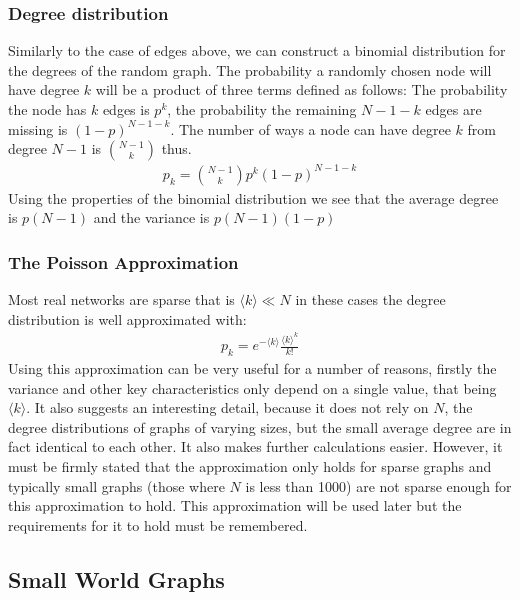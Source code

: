 \documentclass{article}
\begin{document}
            \subsubsection{Degree distribution}
            Similarly to the case of edges above, we can construct a binomial distribution for the degrees of the random graph. The probability a randomly chosen node will have degree $k$ will be a product of three terms defined as follows: The probability the node has $k$ edges is $p^k$, the probability the remaining $N-1-k$ edges are missing is $(1-p)^{N-1-k}$. The number of ways a node can have degree $k$ from degree $N-1$ is $\binom{N-1}{k}$ thus.
            \begin{align*}
                p_{k} = \binom{N-1}{k}p^k(1-p)^{N-1-k}
            \end{align*}  
            Using the properties of the binomial distribution we see that the average degree is $p(N-1)$ and the variance is $p(N-1)(1-p)$
            \subsubsection{The Poisson Approximation}
            Most real networks are sparse that is $\langle k \rangle \ll N$ in these cases the degree distribution is well approximated with:
            \begin{align*}
                p_{k} = e^{-\langle k \rangle}\frac{{\langle k \rangle}^k}{k!}
            \end{align*}
            Using this approximation can be very useful for a number of reasons, firstly the variance and other key characteristics only depend on a single value, that being $\langle k \rangle$. It also suggests an interesting detail, because it does not rely on $N$, the degree distributions of graphs of varying sizes, but the small average degree are in fact identical to each other. It also makes further calculations easier. However, it must be firmly stated that the approximation only holds for sparse graphs and typically small graphs (those where $N$ is less than 1000) are not sparse enough for this approximation to hold. This approximation will be used later but the requirements for it to hold must be remembered.
        \subsection{Small World Graphs}
\end{document}
